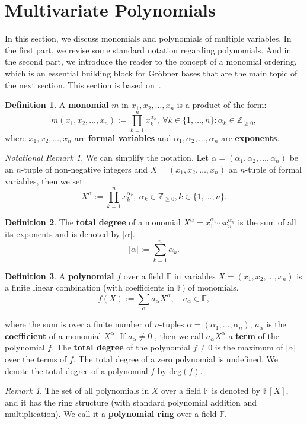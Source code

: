 \documentclass[thesis=M,english]{FITthesis}[2012/10/20]
\theoremstyle{remark}
\newtheorem*{RM}{Remark}
\newtheorem*{NRM}{Notational Remark}
\theoremstyle{definition}
\newtheorem{DF}{Definition}[section]
\begin{document}
\section{Multivariate Polynomials}
In this section, we discuss monomials and polynomials of multiple variables. In the first part, we revise some standard notation regarding polynomials. And in the second part, we introduce the reader to the concept of a monomial ordering, which is an essential building block for Gröbner bases that are the main topic of the next section. This section is based on~\cite{algGeom}.
\begin{DF}
A \textbf{monomial} $m$ in $x_1,x_2,\ldots,x_n$ is a product of the form:
$$
m(x_1,x_2,\ldots,x_n) :=  \prod_{k=1}^nx_k^{\alpha_k},\ \forall k \in \{1, \ldots, n\}: \alpha_k \in\mathbb{Z}_{\geq 0},
$$
where $x_1,x_2,\ldots,x_n$ are \textbf{formal variables} and $\alpha_1,\alpha_2,\ldots,\alpha_n$ are \textbf{exponents}. 
\end{DF}
\begin{NRM} We can simplify the notation. Let $\alpha = (\alpha_1,\alpha_2,\ldots,\alpha_n)$ be an $n$-tuple of non-negative integers and $X = (x_1,x_2,\ldots,x_n)$ an $n$-tuple of formal variables, then we set:
$$
X^\alpha := \prod_{k=1}^nx_k^{\alpha_k},\ \alpha_k \in\mathbb{Z}_{\geq 0}, k \in \{1, \ldots, n\}.
$$
\end{NRM}
\begin{DF}
The \textbf{total degree} of a monomial $X^\alpha=x_1^{\alpha_1}\cdots x_n^{\alpha_n}$ is the sum of all its exponents and is denoted by $|\alpha|$.
$$
|\alpha| := \sum_{k=1}^n \alpha_k.
$$
\end{DF}
\begin{DF}
A \textbf{polynomial}  $f$ over a field $\mathbb{F}$ in variables $X = (x_1,x_2,\ldots,x_n)$ is a finite linear combination (with coefficients in $\mathbb{F}$) of monomials.
$$
f(X) := \sum_{\alpha} a_{\alpha}X^\alpha, \quad a_{\alpha} \in \mathbb{F},
$$
\end{DF}
\noindent where the sum is over a finite number of $n$-tuples $\alpha = (\alpha_1, \ldots, \alpha_n)$, $a_\alpha$ is the \textbf{coefficient} of a monomial $X^\alpha$. If $a_\alpha \neq 0$ , then we call $a_{\alpha}X^\alpha$ a \textbf{term} of the  polynomial $f$. The \textbf{total degree} of the polynomial $f \neq 0$ is the maximum  of $|\alpha |$ over the terms of $f$. The total degree of a zero polynomial is undefined. We denote the total degree of a polynomial $f$ by deg$(f)$.
\begin{RM}
The set of all polynomials in $X$ over a field $\mathbb{F}$ is denoted by $\mathbb{F}[X]$, and it has the ring structure (with standard polynomial addition and multiplication). We call it a \textbf{polynomial ring} over a field $\mathbb{F}$.
\end{RM}
\end{document}
